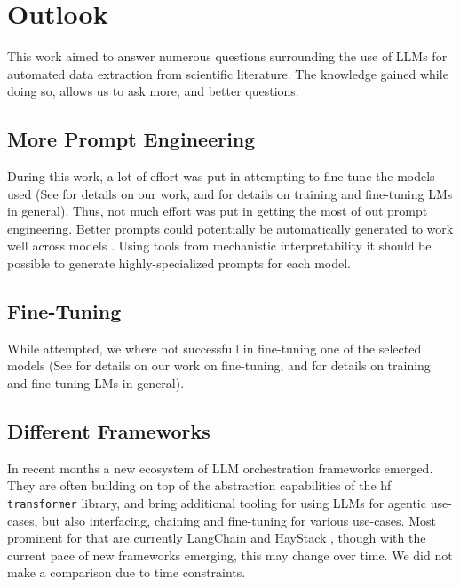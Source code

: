 \chapter{Outlook}\label{chap:outlook}
This work aimed to answer numerous questions surrounding the use of \glspl{LLM} for automated data extraction from scientific literature.
The knowledge gained while doing so, allows us to ask more, and better questions.

\section{More Prompt Engineering}\label{sec:out-prompt}
During this work, a lot of effort was put in attempting to fine-tune the models used (See  for details on our work, and  for details on training and fine-tuning \glspl{LM} in general).
Thus, not much effort was put in getting the most of out prompt engineering.
Better prompts could potentially be automatically generated to work well across models \cite{zhou_large_2022}.
Using tools from mechanistic interpretability \cite{conmy_automated_2023} it should be possible to generate highly-specialized prompts \cite{rumbelow_solidgoldmagikarp_2023} for each model.


\section{Fine-Tuning}\label{sec:out-sft}
While attempted, we where not successfull in fine-tuning one of the selected models (See  for details on our work on fine-tuning, and  for details on training and fine-tuning \glspl{LM} in general).

\section{Different Frameworks}\label{sub:frameworks}
In recent months a new ecosystem of \gls{LLM} orchestration frameworks emerged.
They are often building on top of the abstraction capabilities of the \gls{hf} \verb`transformer` library, and bring additional tooling for using \glspl{LLM} for agentic use-cases, but also interfacing, chaining and fine-tuning for various use-cases.
Most prominent for that are currently LangChain \cite{langchain_2023} and HayStack \cite{haystack_2023}, though with the current pace of new frameworks emerging, this may change over time.
We did not make a comparison due to time constraints.


